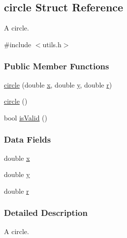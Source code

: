 \hypertarget{structcircle}{\subsection{circle \-Struct \-Reference}
\label{structcircle}
}


\-A circle.  




{\ttfamily \#include $<$utils.\-h$>$}

\subsubsection*{\-Public \-Member \-Functions}
\begin{DoxyCompactItemize}
\item 
\hyperlink{structcircle_a47cfe4c636835410b292a9f1fda841db}{circle} (double \hyperlink{structcircle_a3ecd01f4a611905b29614e61d8c6f068}{x}, double \hyperlink{structcircle_ac060cb1d497b470df6be2d4242369f31}{y}, double \hyperlink{structcircle_a5f252f6cf93b81949dbf334c74931f18}{r})
\item 
\hyperlink{structcircle_a4e0786fc75051f3bbe5de2e08ef9712d}{circle} ()
\item 
bool \hyperlink{structcircle_a103b7ebfdcb2da15c9a19f1e0ecb44a1}{is\-Valid} ()
\end{DoxyCompactItemize}
\subsubsection*{\-Data \-Fields}
\begin{DoxyCompactItemize}
\item 
double \hyperlink{structcircle_a3ecd01f4a611905b29614e61d8c6f068}{x}
\item 
double \hyperlink{structcircle_ac060cb1d497b470df6be2d4242369f31}{y}
\item 
double \hyperlink{structcircle_a5f252f6cf93b81949dbf334c74931f18}{r}
\end{DoxyCompactItemize}


\subsubsection{\-Detailed \-Description}
\-A circle. 

